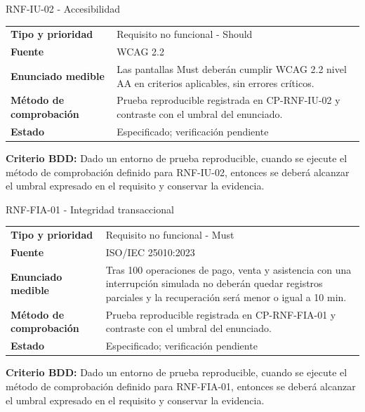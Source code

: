 \documentclass[11pt,a4paper]{article}
\begin{document}
\begin{reqbox}[colframe=Teal]{RNF-IU-02 - Accesibilidad}
\begin{tabularx}{\textwidth}{>{\bfseries}p{3.2cm}Y}
Tipo y prioridad & Requisito no funcional - Should \\
Fuente & WCAG 2.2 \\
Enunciado medible & Las pantallas Must deberán cumplir WCAG 2.2 nivel AA en criterios aplicables, sin errores críticos. \\
Método de comprobación & Prueba reproducible registrada en CP-RNF-IU-02 y contraste con el umbral del enunciado. \\
Estado & Especificado; verificación pendiente \\
\end{tabularx}
\textbf{Criterio BDD:} Dado un entorno de prueba reproducible, cuando se ejecute el método de comprobación definido para RNF-IU-02, entonces se deberá alcanzar el umbral expresado en el requisito y conservar la evidencia.
\end{reqbox}


\begin{reqbox}[colframe=Teal]{RNF-FIA-01 - Integridad transaccional}
\begin{tabularx}{\textwidth}{>{\bfseries}p{3.2cm}Y}
Tipo y prioridad & Requisito no funcional - Must \\
Fuente & ISO/IEC 25010:2023 \\
Enunciado medible & Tras 100 operaciones de pago, venta y asistencia con una interrupción simulada no deberán quedar registros parciales y la recuperación será menor o igual a 10 min. \\
Método de comprobación & Prueba reproducible registrada en CP-RNF-FIA-01 y contraste con el umbral del enunciado. \\
Estado & Especificado; verificación pendiente \\
\end{tabularx}
\textbf{Criterio BDD:} Dado un entorno de prueba reproducible, cuando se ejecute el método de comprobación definido para RNF-FIA-01, entonces se deberá alcanzar el umbral expresado en el requisito y conservar la evidencia.
\end{reqbox}
\end{document}
